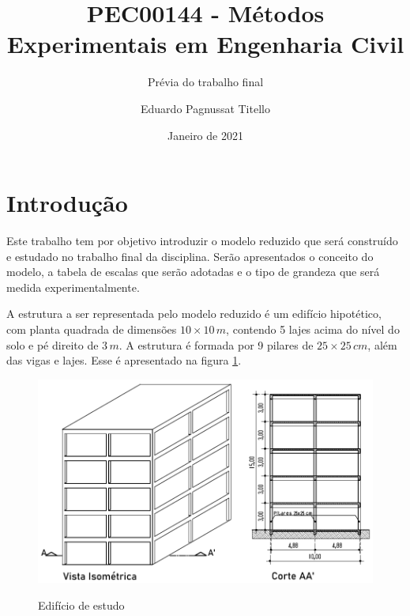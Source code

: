 

\author{Eduardo Pagnussat Titello}
\title{PEC00144 - Métodos Experimentais em Engenharia Civil}
\subtitle{Prévia do trabalho final}
\date{Janeiro de 2021}




\maketitle

\section{Introdução}
Este trabalho tem por objetivo introduzir o modelo reduzido que será construído e estudado no trabalho final da disciplina. Serão apresentados o conceito do modelo, a tabela de escalas que serão adotadas e o tipo de grandeza que será medida experimentalmente.


A estrutura a ser representada pelo modelo reduzido é um edifício hipotético, com planta quadrada de dimensões $10 \times 10 \, m$, contendo 5 lajes acima do nível do solo e pé direito de $3 \, m$. A estrutura é formada por 9 pilares de $25 \times 25 \, cm$,  além das vigas e lajes. Esse é apresentado na figura \ref{fig:edfestudo}.

\begin{figure}
	\centering
	\caption{Edifício de estudo}
	\includegraphics[scale=0.9]{../Images/VistaeCorte}
	\label{fig:edfestudo}
\end{figure}











